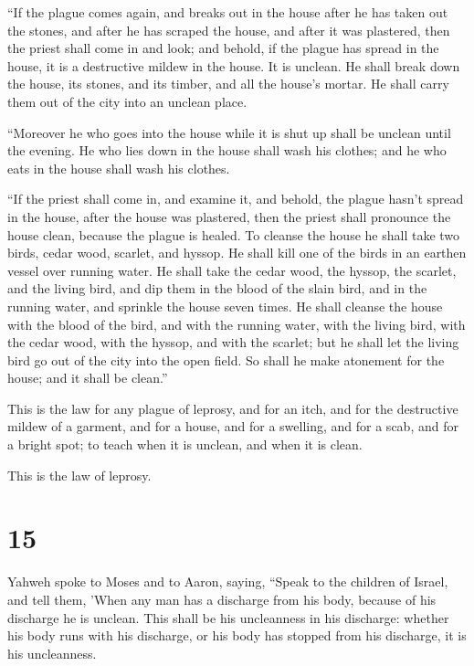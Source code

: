  ``If the plague comes again, and breaks out in the house
after he has taken out the stones, and after he has scraped the house,
and after it was plastered,  then the priest shall come
in and look; and behold, if the plague has spread in the house, it is a
destructive mildew in the house. It is unclean.  He shall
break down the house, its stones, and its timber, and all the house's
mortar. He shall carry them out of the city into an unclean place.

 ``Moreover he who goes into the house while it is shut
up shall be unclean until the evening.  He who lies down
in the house shall wash his clothes; and he who eats in the house shall
wash his clothes.

 ``If the priest shall come in, and examine it, and
behold, the plague hasn't spread in the house, after the house was
plastered, then the priest shall pronounce the house clean, because the
plague is healed.  To cleanse the house he shall take two
birds, cedar wood, scarlet, and hyssop.  He shall kill
one of the birds in an earthen vessel over running water.
 He shall take the cedar wood, the hyssop, the scarlet,
and the living bird, and dip them in the blood of the slain bird, and in
the running water, and sprinkle the house seven times. 
He shall cleanse the house with the blood of the bird, and with the
running water, with the living bird, with the cedar wood, with the
hyssop, and with the scarlet;  but he shall let the
living bird go out of the city into the open field. So shall he make
atonement for the house; and it shall be clean.''

 This is the law for any plague of leprosy, and for an
itch,  and for the destructive mildew of a garment, and
for a house,  and for a swelling, and for a scab, and for
a bright spot;  to teach when it is unclean, and when it
is clean.

This is the law of leprosy.

\hypertarget{section-14}{%
\section{15}\label{section-14}}

 Yahweh spoke to Moses and to Aaron, saying,
 ``Speak to the children of Israel, and tell them, 'When
any man has a discharge from his body, because of his discharge he is
unclean.  This shall be his uncleanness in his discharge:
whether his body runs with his discharge, or his body has stopped from
his discharge, it is his uncleanness.

